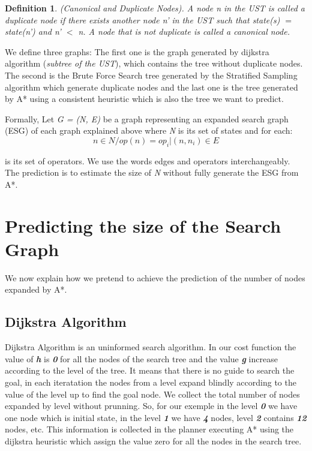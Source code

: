 \documentclass[11pt,a4paper,oneside]{report}
\newtheorem{mydef}{Definition}
\begin{document}
\begin{mydef}
\textit{(Canonical and Duplicate Nodes). A node n in the UST is called a duplicate node if there exists another node n' in the UST such that state(s) $=$ state(n') and n' $<$  n. A node that is not duplicate is called a canonical node.}
\end{mydef}

We define three graphs: The first one is the graph generated by dijkstra algorithm (\textit{subtree of the UST}), which contains the tree without duplicate nodes. The second is the Brute Force Search tree generated by the Stratified Sampling algorithm which generate duplicate nodes and the last one is the tree generated by A* using a consistent heuristic which is also the tree we want to predict.\newline

Formally, Let \textit{G = (N, E)} be a  graph representing an expanded search graph (ESG) of  each graph explained above where \textit{N} is its set of states and  for each:
\[  {n \in  N / op(n) =  {op_i|(n, n_i)}  \in E }  \]

 is its set of operators. We use the words edges and operators interchangeably. The prediction is to estimate the size of \textit{N} without fully generate the ESG from A*.

\section{Predicting the size of the Search Graph}
We now explain how we pretend to achieve the prediction of the number of  nodes expanded by A*.\newline

\subsection{Dijkstra Algorithm}
Dijkstra Algorithm is an uninformed search algorithm. In our cost function the value of \textbf{\textit{h}} is \textbf{\textit{0}} for all the nodes of the search tree and the value \textbf{\textit{g}} increase according to the level of the tree. It means that there is no guide to search the goal, in each iteratation the nodes from a level expand blindly according to the value of the level  up to find the goal node. We collect the total number of nodes expanded by level without prunning. So, for our exemple in the level \textbf{\textit{0}} we have one node which is initial state, in the level \textbf{\textit{1}} we have \textbf{\textit{4}} nodes, level \textbf{\textit{2}} contains \textbf{\textit{12}} nodes, etc. This information is collected in the planner executing A* using the dijkstra heuristic which assign the value zero for all the nodes in the search tree. 
\end{document}

